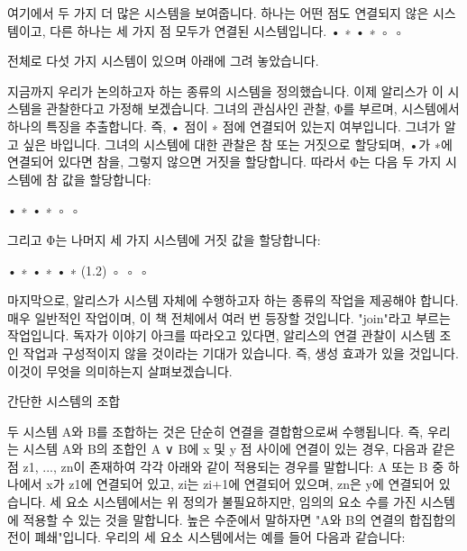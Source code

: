 \documentclass[11pt, a4paper, twoside, openany]{book}
\begin{document}
\par\medskip
여기에서 두 가지 더 많은 시스템을 보여줍니다. 하나는 어떤 점도 연결되지 않은 시스템이고, 다른 하나는 세 가지 점 모두가 연결된 시스템입니다.
•
∗
•
∗
◦
◦

\par\medskip
전체로 다섯 가지 시스템이 있으며 아래에 그려 놓았습니다.

\par\medskip
지금까지 우리가 논의하고자 하는 종류의 시스템을 정의했습니다. 이제 알리스가 이 시스템을 관찰한다고 가정해 보겠습니다. 그녀의 관심사인 관찰, Φ를 부르며, 시스템에서 하나의 특징을 추출합니다. 즉, • 점이 ∗ 점에 연결되어 있는지 여부입니다. 그녀가 알고 싶은 바입니다. 그녀의 시스템에 대한 관찰은 참 또는 거짓으로 할당되며, •가 ∗에 연결되어 있다면 참을, 그렇지 않으면 거짓을 할당합니다. 따라서 Φ는 다음 두 가지 시스템에 참 값을 할당합니다:

\par\medskip
•
∗
•
∗
◦
◦

\par\medskip
그리고 Φ는 나머지 세 가지 시스템에 거짓 값을 할당합니다:

\par\medskip
•
∗
•
∗
•
∗
(1.2)
◦
◦
◦

\par\medskip
마지막으로, 알리스가 시스템 자체에 수행하고자 하는 종류의 작업을 제공해야 합니다. 매우 일반적인 작업이며, 이 책 전체에서 여러 번 등장할 것입니다. "join"라고 부르는 작업입니다. 독자가 이야기 아크를 따라오고 있다면, 알리스의 연결 관찰이 시스템 조인 작업과 구성적이지 않을 것이라는 기대가 있습니다. 즉, 생성 효과가 있을 것입니다. 이것이 무엇을 의미하는지 살펴보겠습니다.

\par\medskip
간단한 시스템의 조합

\par\medskip
두 시스템 A\hspace{0pt}와 B\hspace{0pt}를 조합하는 것은 단순히 연결을 결합함으로써 수행됩니다. 즉, 우리는 시스템 A\hspace{0pt}와 B\hspace{0pt}의 조합인 A ∨ B\hspace{0pt}에 x 및 y 점 사이에 연결이 있는 경우, 다음과 같은 점 z1, ..., zn\hspace{0pt}이 존재하여 각각 아래와 같이 적용되는 경우를 말합니다: A 또는 B 중 하나에서 x\hspace{0pt}가 z1\hspace{0pt}에 연결되어 있고, zi\hspace{0pt}는 zi+1\hspace{0pt}에 연결되어 있으며, zn\hspace{0pt}은 y\hspace{0pt}에 연결되어 있습니다. 세 요소 시스템에서는 위 정의가 불필요하지만, 임의의 요소 수를 가진 시스템에 적용할 수 있는 것을 말합니다. 높은 수준에서 말하자면 "A\hspace{0pt}와 B\hspace{0pt}의 연결의 합집합의 전이 폐쇄"입니다. 우리의 세 요소 시스템에서는 예를 들어 다음과 같습니다:
\end{document}
